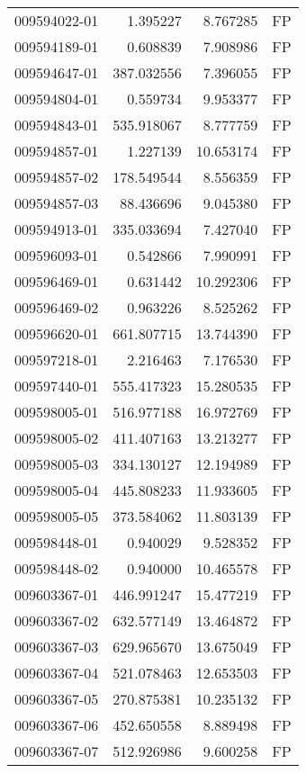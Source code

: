 \begin{tabular}{lrrl}
009594022-01 &    1.395227 &     8.767285 &   FP \\
009594189-01 &    0.608839 &     7.908986 &   FP \\
009594647-01 &  387.032556 &     7.396055 &   FP \\
009594804-01 &    0.559734 &     9.953377 &   FP \\
009594843-01 &  535.918067 &     8.777759 &   FP \\
009594857-01 &    1.227139 &    10.653174 &   FP \\
009594857-02 &  178.549544 &     8.556359 &   FP \\
009594857-03 &   88.436696 &     9.045380 &   FP \\
009594913-01 &  335.033694 &     7.427040 &   FP \\
009596093-01 &    0.542866 &     7.990991 &   FP \\
009596469-01 &    0.631442 &    10.292306 &   FP \\
009596469-02 &    0.963226 &     8.525262 &   FP \\
009596620-01 &  661.807715 &    13.744390 &   FP \\
009597218-01 &    2.216463 &     7.176530 &   FP \\
009597440-01 &  555.417323 &    15.280535 &   FP \\
009598005-01 &  516.977188 &    16.972769 &   FP \\
009598005-02 &  411.407163 &    13.213277 &   FP \\
009598005-03 &  334.130127 &    12.194989 &   FP \\
009598005-04 &  445.808233 &    11.933605 &   FP \\
009598005-05 &  373.584062 &    11.803139 &   FP \\
009598448-01 &    0.940029 &     9.528352 &   FP \\
009598448-02 &    0.940000 &    10.465578 &   FP \\
009603367-01 &  446.991247 &    15.477219 &   FP \\
009603367-02 &  632.577149 &    13.464872 &   FP \\
009603367-03 &  629.965670 &    13.675049 &   FP \\
009603367-04 &  521.078463 &    12.653503 &   FP \\
009603367-05 &  270.875381 &    10.235132 &   FP \\
009603367-06 &  452.650558 &     8.889498 &   FP \\
009603367-07 &  512.926986 &     9.600258 &   FP \\

\end{tabular}
